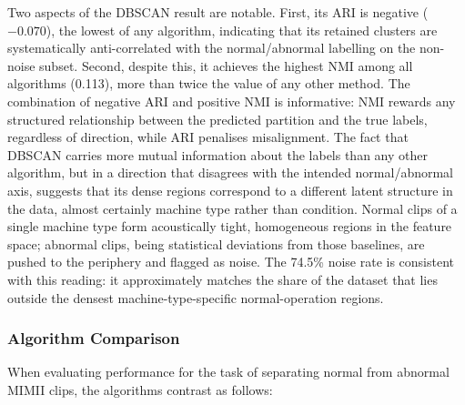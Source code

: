 \documentclass[runningheads,a4paper,11pt]{report}
\begin{document}
Two aspects of the DBSCAN result are notable. First, its ARI is negative ($-0.070$), the lowest of any algorithm, indicating that its retained clusters are systematically anti-correlated with the normal/abnormal labelling on the non-noise subset. Second, despite this, it achieves the highest NMI among all algorithms (0.113), more than twice the value of any other method. The combination of negative ARI and positive NMI is informative: NMI rewards any structured relationship between the predicted partition and the true labels, regardless of direction, while ARI penalises misalignment. The fact that DBSCAN carries more mutual information about the labels than any other algorithm, but in a direction that disagrees with the intended normal/abnormal axis, suggests that its dense regions correspond to a different latent structure in the data, almost certainly machine type rather than condition. Normal clips of a single machine type form acoustically tight, homogeneous regions in the feature space; abnormal clips, being statistical deviations from those baselines, are pushed to the periphery and flagged as noise. The 74.5\% noise rate is consistent with this reading: it approximately matches the share of the dataset that lies outside the densest machine-type-specific normal-operation regions.

\subsubsection{Algorithm Comparison}

When evaluating performance for the task of separating normal from abnormal MIMII clips, the algorithms contrast as follows:
\end{document}
